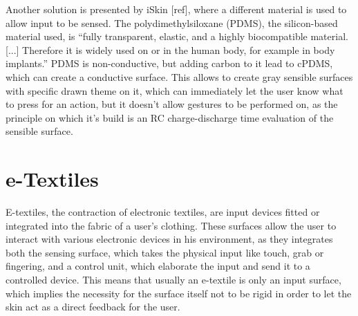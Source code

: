 \documentclass{sigchi}
\begin{document}
Another solution is presented by iSkin [ref], where a different material is used to allow input to be sensed. The polydimethylsiloxane (PDMS), the silicon-based material used, is “fully transparent, elastic, and a highly biocompatible material. [...] Therefore it is widely used on or in the human body, for example in body implants.” PDMS is non-conductive, but adding carbon to it lead to cPDMS, which can create a conductive surface. This allows to create gray sensible surfaces with specific drawn theme on it, which can immediately let the user know what to press for an action, but it doesn’t allow gestures to be performed on, as the principle on which it’s build is an RC charge-discharge time evaluation of the sensible surface.

\section{e-Textiles}
E-textiles, the contraction of electronic textiles, are input devices fitted or integrated into the fabric of a user's clothing. These surfaces allow the user to interact with various electronic devices in his environment, as they integrates both the sensing surface, which takes the physical input like touch, grab or fingering,  and a control unit, which elaborate the input and send it to a controlled device. This means that usually an e-textile is only an input surface, which implies the necessity for the surface itself not to be rigid in order to let the skin act as a direct feedback for the user.
\end{document}
